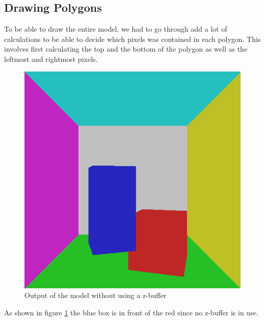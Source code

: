 \documentclass[a4paper,11pt]{article}
\begin{document}
\subsection{Drawing Polygons}
To be able to draw the entire model, we had to go through add a lot of calculations to be able to decide which pixels was contained in each polygon. This involves first calculating the top and the bottom of the polygon as well as the leftmost and rightmost pixels.   

\begin{figure}[h!]
	\centering	
	\includegraphics[width=0.4\linewidth]{screenshot15.png}
	\caption{Output of the model without using a z-buffer}
	\label{fig15}
\end{figure}

As shown in figure \ref{fig15} the blue box is in front of the red since no z-buffer is in use.
\end{document}
